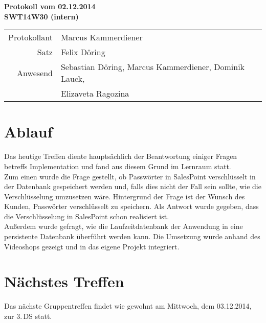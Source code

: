 \documentclass{scrartcl}
\begin{document}
\begin{center}
\LARGE \bf{Protokoll vom 02.12.2014 \\
SWT14W30 (intern)}
\end{center}

\begin{tabular}{rp{10cm}}
Protokollant & Marcus Kammerdiener \\
Satz & Felix Döring \\
Anwesend & Sebastian Döring, Marcus Kammerdiener, Dominik Lauck,\\
& Elizaveta Ragozina \\
\end{tabular}

\vspace*{3em}

\section{Ablauf}
Das heutige Treffen diente hauptsächlich der Beantwortung einiger Fragen betreffs Implementation und fand aus diesem Grund im Lernraum statt. \\
Zum einen wurde die Frage gestellt, ob Passwörter in SalesPoint verschlüsselt in der Datenbank gespeichert werden und, falls dies nicht der Fall sein sollte, wie die Verschlüsselung umzusetzen wäre. Hintergrund der Frage ist der Wunsch des Kunden, Passwörter verschlüsselt zu speichern. Als Antwort wurde gegeben, dass die Verschlüsselung in SalesPoint schon realisiert ist. \\
Außerdem wurde gefragt, wie die Laufzeitdatenbank der Anwendung in eine persistente Datenbank überführt werden kann. Die Umsetzung wurde anhand des Videoshops gezeigt und in das eigene Projekt integriert.

\vspace*{1em}

\section{N\"achstes Treffen}
Das nächste Gruppentreffen findet wie gewohnt am Mittwoch, dem 03.12.2014, zur 3.\,DS statt.
\end{document}
